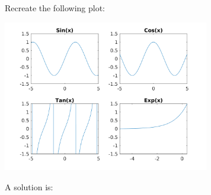\begin{ex}
Recreate the following plot: 
\begin{center}
\includegraphics[width=9cm]{pic/plotting/subplot_exercise_1.png}
\end{center}
\begin{hint}
\end{hint}
\begin{sol}
A solution is:
\begin{lstlisting}
\end{lstlisting}
\end{sol}
\end{ex}
 